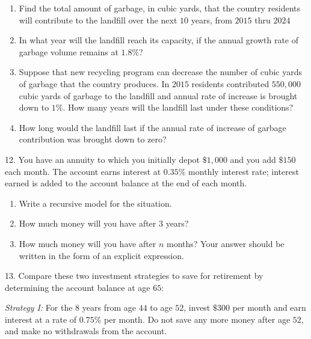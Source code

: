 \documentclass[10pt,]{book}
\theoremstyle{plain}
\theoremstyle{definition}
\theoremstyle{definition}
\theoremstyle{definition}
\numberwithin{equation}{section}
\begin{document}
\begin{exerciselist}
\leavevmode%
\begin{enumerate}[label=(\alph*)]
\item\hypertarget{li-90}{}Find the total amount of garbage, in cubic yards, that the country residents will contribute to the landfill over the next \(10\) years, from \(2015\) thru \(2024\)%
\item\hypertarget{li-91}{}In what year will the landfill reach its capacity, if the annual growth rate of garbage volume remains at \(1.8\%\)?%
\item\hypertarget{li-92}{}Suppose that new recycling program can decrease the number of cubic yards of garbage that the country produces. In \(2015\) residents contributed \(550,000\) cubic yards of garbage to the landfill and annual rate of increase is brought down to \(1\%\).  How many years will the landfill last under these conditions?%
\item\hypertarget{li-93}{}How long would the landfill last if the annual rate of increase of garbage contribution was brought down to zero?%
\end{enumerate}
\par\smallskip
\item[12.]\hypertarget{exercise-43}{}\hypertarget{p-184}{}%
You have an annuity to which you initially depot \(\$1,000\) and you add \(\$150\) each month. The account earns interest at \(0.35\%\) monthly interest rate; interest earned is added to the account balance at the end of each month.%
\leavevmode%
\begin{enumerate}[label=(\alph*)]
\item\hypertarget{li-94}{}Write a recursive model for the situation.%
\item\hypertarget{li-95}{}How much money will you have after \(3\) years?%
\item\hypertarget{li-96}{}How much money will you have after \(n\) months? Your answer should be written in the form of an explicit expression.%
\end{enumerate}
\par\smallskip
\item[13.]\hypertarget{exercise-44}{}\hypertarget{p-185}{}%
Compare these two investment strategies to save for retirement by determining the account balance at age \(65\):%
\par
\hypertarget{p-186}{}%
\emph{Strategy I:} For the \(8\) years from age \(44\) to age \(52\), invest \(\$300\) per month and earn interest at a rate of \(0.75\%\) per month. Do not save any more money after age \(52\), and make no withdrawals from the account.%

\end{exerciselist}
\end{document}
